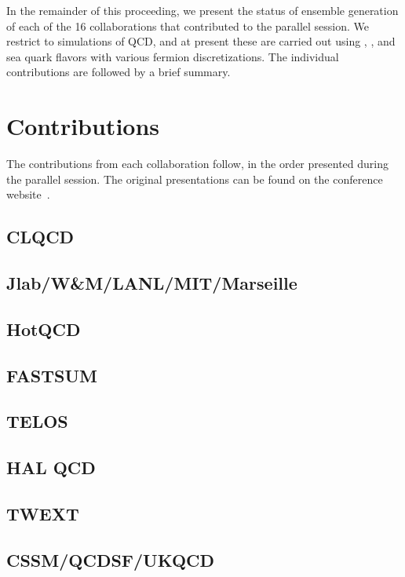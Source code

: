 \documentclass[a4paper,11pt]{article}
\begin{document}
In the remainder of this proceeding, we present the status of ensemble
generation of each of the 16 collaborations that contributed to the
parallel session. We restrict to simulations of QCD, and at present
these are carried out using , , and
 sea quark flavors with various fermion
discretizations. The individual contributions are followed by a brief
summary.

\section{Contributions}
The contributions from each collaboration follow, in the order
presented during the parallel session. The original presentations can
be found on the conference website~\cite{parallel-session}.

\newpage
\subsection{CLQCD}

\subsection{Jlab/W\&M/LANL/MIT/Marseille}

\subsection{HotQCD}

\subsection{FASTSUM}

\subsection{TELOS}

\subsection{HAL QCD}

\subsection{TWEXT}

\subsection{CSSM/QCDSF/UKQCD}
\end{document}
